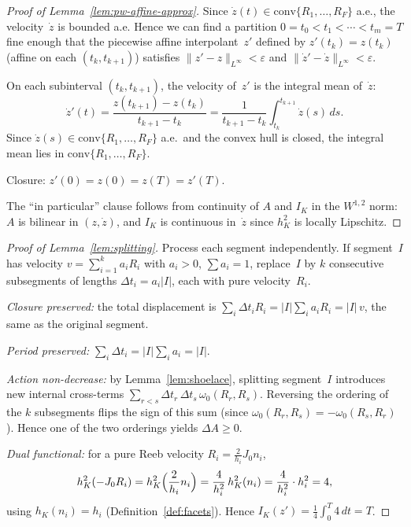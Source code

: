 
\begin{proof}[Proof of Lemma~\ref{lem:pw-affine-approx}]
Since $\dot{z}(t) \in \mathrm{conv}\{R_1, \ldots, R_F\}$ a.e.,
the velocity~$\dot{z}$ is bounded a.e.
Hence we can find a partition $0 = t_0 < t_1 < \cdots < t_m = T$
fine enough that the piecewise affine interpolant~$z'$
defined by $z'(t_k) = z(t_k)$ (affine on each
$(t_k, t_{k+1})$) satisfies
$\|z' - z\|_{L^\infty} < \varepsilon$ and
$\|\dot{z}' - \dot{z}\|_{L^\infty} < \varepsilon$.

On each subinterval $(t_k, t_{k+1})$, the velocity
of~$z'$ is the integral mean of~$\dot{z}$:
\[
  \dot{z}'(t)
  = \frac{z(t_{k+1}) - z(t_k)}{t_{k+1} - t_k}
  = \frac{1}{t_{k+1} - t_k}
    \int_{t_k}^{t_{k+1}} \dot{z}(s)\, ds.
\]
Since $\dot{z}(s) \in \mathrm{conv}\{R_1, \ldots, R_F\}$
a.e.\ and the convex hull is closed, the integral mean
lies in $\mathrm{conv}\{R_1, \ldots, R_F\}$.

Closure: $z'(0) = z(0) = z(T) = z'(T)$.

The ``in particular'' clause follows from
continuity of $A$ and $I_K$ in the $W^{1,2}$ norm:
$A$ is bilinear in $(z, \dot{z})$, and
$I_K$ is continuous in~$\dot{z}$ since $h_K^2$ is
locally Lipschitz.
\end{proof}

\begin{proof}[Proof of Lemma~\ref{lem:splitting}]
Process each segment independently.
If segment~$I$ has velocity
$v = \sum_{i=1}^k a_i R_i$ with $a_i > 0$,
$\sum a_i = 1$,
replace~$I$ by $k$ consecutive subsegments of
lengths $\Delta t_i = a_i |I|$, each with pure
velocity~$R_i$.

\emph{Closure preserved:}
the total displacement is
$\sum_i \Delta t_i R_i
  = |I| \sum_i a_i R_i = |I|\, v$,
the same as the original segment.

\emph{Period preserved:}
$\sum_i \Delta t_i = |I| \sum_i a_i = |I|$.

\emph{Action non-decrease:}
by Lemma~\ref{lem:shoelace},
splitting segment~$I$ introduces
new internal cross-terms
$\sum_{r < s} \Delta t_r\, \Delta t_s\,
  \omega_0(R_r, R_s)$.
Reversing the ordering of the $k$ subsegments
flips the sign of this sum
(since $\omega_0(R_r, R_s) = -\omega_0(R_s, R_r)$).
Hence one of the two orderings yields
$\Delta A \geq 0$.

\emph{Dual functional:}
for a pure Reeb velocity
$R_i = \frac{2}{h_i} J_0 n_i$,
\[
  h_K^2(-J_0 R_i)
  = h_K^2\Bigl(\frac{2}{h_i} n_i\Bigr)
  = \frac{4}{h_i^2}\, h_K^2(n_i)
  = \frac{4}{h_i^2} \cdot h_i^2
  = 4,
\]
using $h_K(n_i) = h_i$
(Definition~\ref{def:facets}).
Hence
$I_K(z') = \frac{1}{4} \int_0^T 4\, dt = T$.
\end{proof}

